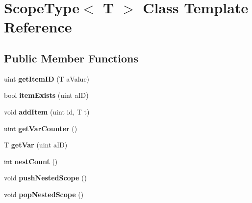 \hypertarget{a00021}{\section{Scope\+Type$<$ T $>$ Class Template Reference}
\label{a00021}
}
\subsection*{Public Member Functions}
\begin{DoxyCompactItemize}
\item 
\hypertarget{a00021_a92a1d1964b00c4d0a7af93eaf37c7e93}{uint {\bfseries get\+Item\+I\+D} (T a\+Value)}\label{a00021_a92a1d1964b00c4d0a7af93eaf37c7e93}

\item 
\hypertarget{a00021_a35f343c5c865b3a570f8cfc6e70ee0c2}{bool {\bfseries item\+Exists} (uint a\+I\+D)}\label{a00021_a35f343c5c865b3a570f8cfc6e70ee0c2}

\item 
\hypertarget{a00021_a4f7c5a43069789e9adb9cc1b8d8d95e2}{void {\bfseries add\+Item} (uint id, T t)}\label{a00021_a4f7c5a43069789e9adb9cc1b8d8d95e2}

\item 
\hypertarget{a00021_a3252318a33eb6abc5f6933e7265d4029}{uint {\bfseries get\+Var\+Counter} ()}\label{a00021_a3252318a33eb6abc5f6933e7265d4029}

\item 
\hypertarget{a00021_a3ee6c000d9df265481a508c2a22581a4}{T {\bfseries get\+Var} (uint a\+I\+D)}\label{a00021_a3ee6c000d9df265481a508c2a22581a4}

\item 
\hypertarget{a00021_ae0ca204f4617ce2957de1494c2fe0fd6}{int {\bfseries nest\+Count} ()}\label{a00021_ae0ca204f4617ce2957de1494c2fe0fd6}

\item 
\hypertarget{a00021_a5c8ebe9e5412756c6136e60bbfdf31cb}{void {\bfseries push\+Nested\+Scope} ()}\label{a00021_a5c8ebe9e5412756c6136e60bbfdf31cb}

\item 
\hypertarget{a00021_a8a11c6e96d4f1c29804419d330012582}{void {\bfseries pop\+Nested\+Scope} ()}\label{a00021_a8a11c6e96d4f1c29804419d330012582}

\end{DoxyCompactItemize}
